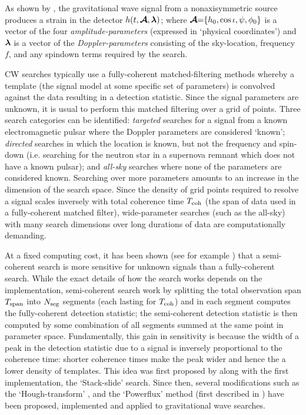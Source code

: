 \documentclass[aps, prd, twocolumn, superscriptaddress, floatfix, showpacs, nofootinbib, longbibliography]{revtex4-1}
\begin{document}
As shown by \citet{jks1998}, the gravitational wave signal from a
nonaxisymmetric source produces a strain in the detector $h(t, \boldsymbol{\mathcal{A}}, \boldsymbol{\mathbf{\lambda}})$;
where $\boldsymbol{\mathcal{A}}{=}\{h_0, \cos\iota, \psi, \phi_0\}$ is a vector of the four
\emph{amplitude-parameters} (expressed in `physical coordinates') and
$\boldsymbol{\mathbf{\lambda}}$ is a vector of the \emph{Doppler-parameters} consisting of the
sky-location, frequency $f$, and any spindown terms required by the search.

CW searches typically use a fully-coherent matched-filtering methods whereby a
template (the signal model at some specific set of parameters) is convolved
against the data resulting in a detection statistic. Since the signal
parameters are unknown, it is usual to perform this matched filtering over a
grid of points.  Three search categories can be identified: \emph{targeted}
searches for a signal from a known electromagnetic pulsar where the Doppler
parameters are considered `known'; \emph{directed} searches in which the
location is known, but not the frequency and spin-down (i.e.  searching for the
neutron star in a supernova remnant which does not have a known pulsar); and
\emph{all-sky} searches where none of the parameters are considered known.
Searching over more parameters amounts to an increase in the dimension of the
search space. Since the density of grid points required to resolve a signal
scales inversely with total coherence time $T_{\rm coh}$ (the span of data used in
a fully-coherent matched filter), wide-parameter searches (such as the all-sky)
with many search dimensions over long durations of data are computationally
demanding.

At a fixed computing cost, it has been shown (see for example \citep{brady1998,
prix2012}) that a semi-coherent search is more sensitive for unknown signals
than a fully-coherent search. While the exact details of how the search works
depends on the implementation, semi-coherent search work by splitting the total
observation span $T_{\rm span}$ into $N_{\rm seg}$ segments (each lasting for $T_{\rm coh}$) and
in each segment computes the fully-coherent detection statistic; the
semi-coherent detection statistic is then computed by some combination of all
segments summed at the same point in parameter space. Fundamentally, this gain
in sensitivity is because the width of a peak in the detection statistic due to
a signal is inversely proportional to the coherence time: shorter coherence times
make the peak wider and hence the a lower density of templates. This idea was
first proposed by \citet{brady2000} along with the first implementation, the
`Stack-slide' search. Since then, several modifications such as the
`Hough-transform' \citep{krishnan2004, astone2014}, and the `Powerflux' method
(first described in \citet{allyskyS42008}) have been proposed, implemented and
applied to gravitational wave searches.
\end{document}
